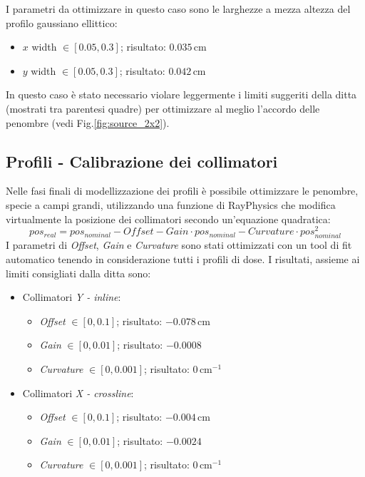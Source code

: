 I parametri da ottimizzare in questo caso sono le larghezze a mezza altezza del profilo gaussiano ellittico:
\begin{itemize}
\item $x$ width $\in [0.05,0.3]$; risultato: $0.035\,$cm
\item $y$ width $\in [0.05,0.3]$; risultato: $0.042\,$cm
\end{itemize}
In questo caso è stato necessario violare leggermente i limiti suggeriti della ditta (mostrati tra parentesi quadre) per ottimizzare al meglio l'accordo delle penombre (vedi Fig.\ref{fig:source_2x2}).

\subsection{Profili - Calibrazione dei collimatori}
Nelle fasi finali di modellizzazione dei profili è possibile ottimizzare le penombre, specie a campi grandi, utilizzando una funzione di RayPhysics che modifica virtualmente la posizione dei collimatori secondo un'equazione quadratica:
\begin{equation}
pos_{real} = pos_{nominal} - Offset - Gain\cdot pos_{nominal} - Curvature \cdot pos_{nominal}^2
\label{eq:offset}
\end{equation}
I parametri di \textit{Offset}, \textit{Gain} e \textit{Curvature} sono stati ottimizzati con un tool di fit automatico tenendo in considerazione tutti i profili di dose. I risultati, assieme ai limiti consigliati dalla ditta sono:
\begin{itemize}
\item Collimatori \textit{Y - inline}:
\begin{itemize}
\item \textit{Offset} $\in [0,0.1]$; risultato: $-0.078\,$cm
\item \textit{Gain} $\in [0,0.01]$; risultato: $-0.0008\,$
\item \textit{Curvature} $\in [0,0.001]$; risultato: $0\,$cm$^{-1}$
\end{itemize}
\item Collimatori \textit{X - crossline}:
\begin{itemize}
\item \textit{Offset} $\in [0,0.1]$; risultato: $-0.004\,$cm
\item \textit{Gain} $\in [0,0.01]$; risultato: $-0.0024\,$
\item \textit{Curvature} $\in [0,0.001]$; risultato: $0\,$cm$^{-1}$
\end{itemize}
\end{itemize}

